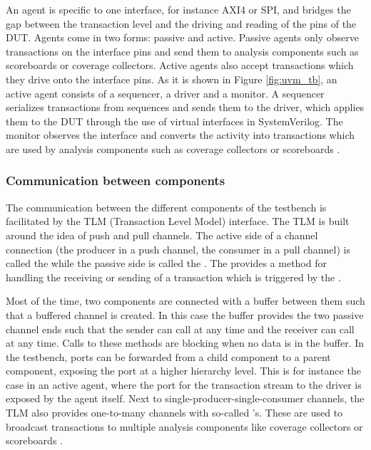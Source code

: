 An agent is specific to one interface, for instance AXI4 or SPI, and bridges the gap between the transaction level
and the driving and reading of the pins of the DUT. Agents come in two forms: passive and active. Passive agents only
observe transactions on the interface pins and send them to analysis components such as scoreboards or coverage
collectors. Active agents also accept transactions which they drive onto the interface pins. As it is shown in Figure
\ref{fig:uvm_tb}, an active agent consists of a sequencer, a driver and a monitor. A sequencer serializes
transactions from sequences and sends them to the driver, which applies them to the DUT through the use of virtual
interfaces in SystemVerilog. The monitor observes the interface and converts the activity into transactions which are
used by analysis components such as coverage collectors or scoreboards \cite[ch. 4.3]{mehta2018asic}.

\subsubsection{Communication between components} %

The communication between the different components of the testbench is facilitated by the TLM (Transaction Level
Model) interface. The TLM is built around the idea of push and pull channels. The active side of a channel connection
(the producer in a push channel, the consumer in a pull channel) is called the  while the passive side is
called the . The  provides a method for handling the receiving or sending of a transaction
which is triggered by the  \cite[ch. 4.5]{mehta2018asic}.

Most of the time, two components are connected with a buffer between them such
that a buffered channel is created. In this case the buffer provides the two passive channel ends such that the
sender can call  at any time and the receiver can call  at any time. Calls to these methods are
blocking when no data is in the buffer. In the testbench, ports can be forwarded from a child component to a parent
component, exposing the port at a higher hierarchy level. This is for instance the case in an active agent, where the
port for the transaction stream to the driver is exposed by the agent itself. Next to single-producer-single-consumer
channels, the TLM also provides one-to-many channels with so-called 's. These are used to
broadcast transactions to multiple analysis components like coverage collectors or scoreboards \cite[ch. 4.5]{mehta2018asic}.

